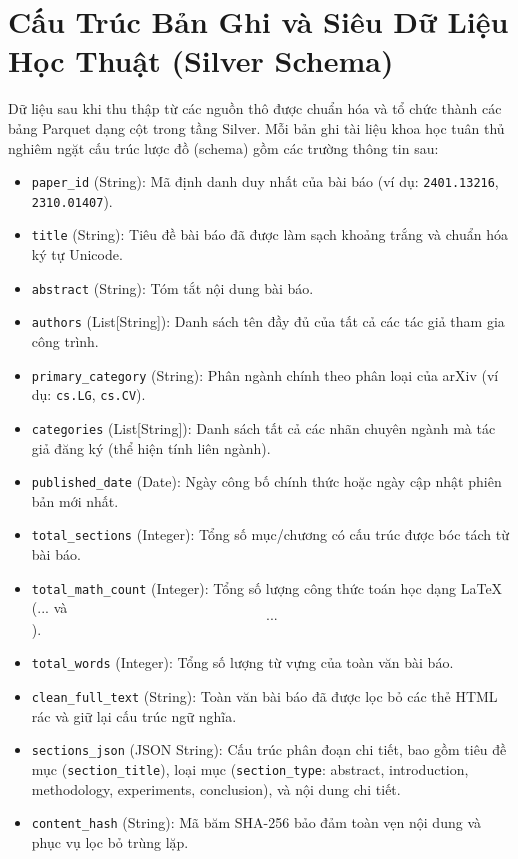\section{Cấu Trúc Bản Ghi và Siêu Dữ Liệu Học Thuật (Silver Schema)}

Dữ liệu sau khi thu thập từ các nguồn thô được chuẩn hóa và tổ chức thành các bảng Parquet dạng cột trong tầng Silver. Mỗi bản ghi tài liệu khoa học tuân thủ nghiêm ngặt cấu trúc lược đồ (schema) gồm các trường thông tin sau:

\begin{itemize}
  \item \texttt{paper\_id} (String): Mã định danh duy nhất của bài báo (ví dụ: \texttt{2401.13216}, \texttt{2310.01407}).
  \item \texttt{title} (String): Tiêu đề bài báo đã được làm sạch khoảng trắng và chuẩn hóa ký tự Unicode.
  \item \texttt{abstract} (String): Tóm tắt nội dung bài báo.
  \item \texttt{authors} (List[String]): Danh sách tên đầy đủ của tất cả các tác giả tham gia công trình.
  \item \texttt{primary\_category} (String): Phân ngành chính theo phân loại của arXiv (ví dụ: \texttt{cs.LG}, \texttt{cs.CV}).
  \item \texttt{categories} (List[String]): Danh sách tất cả các nhãn chuyên ngành mà tác giả đăng ký (thể hiện tính liên ngành).
  \item \texttt{published\_date} (Date): Ngày công bố chính thức hoặc ngày cập nhật phiên bản mới nhất.
  \item \texttt{total\_sections} (Integer): Tổng số mục/chương có cấu trúc được bóc tách từ bài báo.
  \item \texttt{total\_math\_count} (Integer): Tổng số lượng công thức toán học dạng LaTeX ($...$ và $$...$$).
  \item \texttt{total\_words} (Integer): Tổng số lượng từ vựng của toàn văn bài báo.
  \item \texttt{clean\_full\_text} (String): Toàn văn bài báo đã được lọc bỏ các thẻ HTML rác và giữ lại cấu trúc ngữ nghĩa.
  \item \texttt{sections\_json} (JSON String): Cấu trúc phân đoạn chi tiết, bao gồm tiêu đề mục (\texttt{section\_title}), loại mục (\texttt{section\_type}: abstract, introduction, methodology, experiments, conclusion), và nội dung chi tiết.
  \item \texttt{content\_hash} (String): Mã băm SHA-256 bảo đảm toàn vẹn nội dung và phục vụ lọc bỏ trùng lặp.
\end{itemize}


